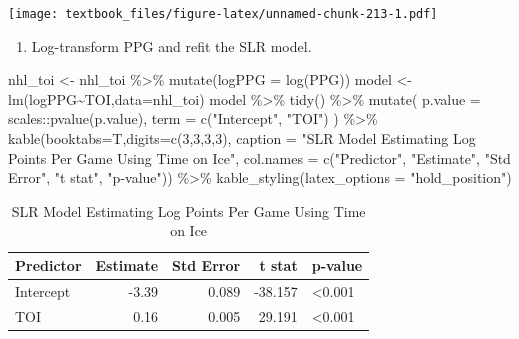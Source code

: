 \documentclass[
  11pt,
]{book}
\newenvironment{Shaded}{\begin{snugshade}}{\end{snugshade}}
\newcommand{\AttributeTok}[1]{\textcolor[rgb]{0.77,0.63,0.00}{#1}}
\newcommand{\DecValTok}[1]{\textcolor[rgb]{0.00,0.00,0.81}{#1}}
\newcommand{\FunctionTok}[1]{\textcolor[rgb]{0.00,0.00,0.00}{#1}}
\newcommand{\NormalTok}[1]{#1}
\newcommand{\OtherTok}[1]{\textcolor[rgb]{0.56,0.35,0.01}{#1}}
\newcommand{\SpecialCharTok}[1]{\textcolor[rgb]{0.00,0.00,0.00}{#1}}
\newcommand{\StringTok}[1]{\textcolor[rgb]{0.31,0.60,0.02}{#1}}
\providecommand{\tightlist}{%
  \setlength{\itemsep}{0pt}\setlength{\parskip}{0pt}}
\theoremstyle{definition}
\theoremstyle{definition}
\theoremstyle{definition}
\theoremstyle{definition}
\theoremstyle{remark}
\begin{document}
\texttt{[image: textbook\_files/figure-latex/unnamed-chunk-213-1.pdf]}
\newpage

\begin{enumerate}
\def\labelenumi{(\alph{enumi})}
\setcounter{enumi}{4}
\tightlist
\item
  Log-transform PPG and refit the SLR model.
\end{enumerate}

\begin{Shaded}
\begin{Highlighting}[]
\NormalTok{nhl\_toi }\OtherTok{\textless{}{-}}\NormalTok{ nhl\_toi }\SpecialCharTok{\%\textgreater{}\%} \FunctionTok{mutate}\NormalTok{(}\AttributeTok{logPPG =} \FunctionTok{log}\NormalTok{(PPG))}
\NormalTok{model }\OtherTok{\textless{}{-}} \FunctionTok{lm}\NormalTok{(logPPG}\SpecialCharTok{\textasciitilde{}}\NormalTok{TOI,}\AttributeTok{data=}\NormalTok{nhl\_toi)}
\NormalTok{model }\SpecialCharTok{\%\textgreater{}\%} \FunctionTok{tidy}\NormalTok{() }\SpecialCharTok{\%\textgreater{}\%}
  \FunctionTok{mutate}\NormalTok{(}
    \AttributeTok{p.value =}\NormalTok{ scales}\SpecialCharTok{::}\FunctionTok{pvalue}\NormalTok{(p.value),}
    \AttributeTok{term =} \FunctionTok{c}\NormalTok{(}\StringTok{"Intercept"}\NormalTok{, }\StringTok{"TOI"}\NormalTok{)}
\NormalTok{  ) }\SpecialCharTok{\%\textgreater{}\%}
  \FunctionTok{kable}\NormalTok{(}\AttributeTok{booktabs=}\NormalTok{T,}\AttributeTok{digits=}\FunctionTok{c}\NormalTok{(}\DecValTok{3}\NormalTok{,}\DecValTok{3}\NormalTok{,}\DecValTok{3}\NormalTok{,}\DecValTok{3}\NormalTok{), }
        \AttributeTok{caption =} \StringTok{"SLR Model Estimating Log Points Per Game Using Time on Ice"}\NormalTok{,}
        \AttributeTok{col.names =} \FunctionTok{c}\NormalTok{(}\StringTok{"Predictor"}\NormalTok{, }\StringTok{"Estimate"}\NormalTok{, }\StringTok{"Std Error"}\NormalTok{, }\StringTok{"t stat"}\NormalTok{, }\StringTok{"p{-}value"}\NormalTok{)) }\SpecialCharTok{\%\textgreater{}\%}
  \FunctionTok{kable\_styling}\NormalTok{(}\AttributeTok{latex\_options =} \StringTok{"hold\_position"}\NormalTok{)}
\end{Highlighting}
\end{Shaded}

\begin{table}[!h]

\caption{\label{tab:unnamed-chunk-214}SLR Model Estimating Log Points Per Game Using Time on Ice}
\centering
\begin{tabular}[t]{lrrrl}
\toprule
Predictor & Estimate & Std Error & t stat & p-value\\
\midrule
Intercept & -3.39 & 0.089 & -38.157 & <0.001\\
TOI & 0.16 & 0.005 & 29.191 & <0.001\\
\bottomrule
\end{tabular}
\end{table}
\end{document}

